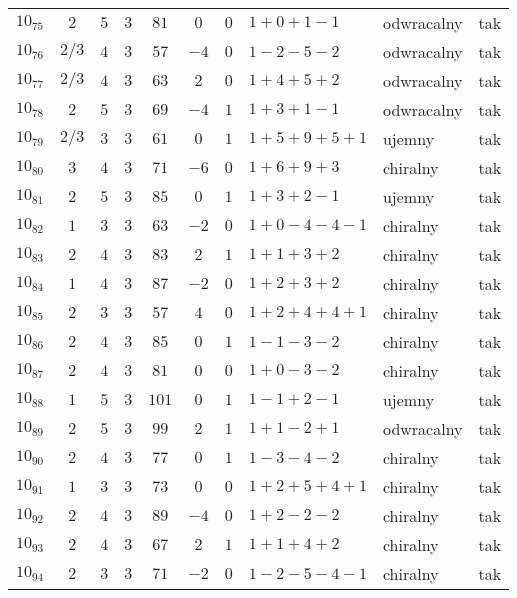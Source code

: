 \begin{longtable}{lccccccllc}
$10_{75}$  & $2$   & $5$ & $3$ & $81$  & $0$  & $0$ & $1+0+1-1$     & odwracalny & tak \\
$10_{76}$  & $2/3$ & $4$ & $3$ & $57$  & $-4$ & $0$ & $1-2-5-2$     & odwracalny & tak \\
$10_{77}$  & $2/3$ & $4$ & $3$ & $63$  & $2$  & $0$ & $1+4+5+2$     & odwracalny & tak \\
$10_{78}$  & $2$   & $5$ & $3$ & $69$  & $-4$ & $1$ & $1+3+1-1$     & odwracalny & tak \\
$10_{79}$  & $2/3$ & $3$ & $3$ & $61$  & $0$  & $1$ & $1+5+9+5+1$   & ujemny     & tak \\
$10_{80}$  & $3$   & $4$ & $3$ & $71$  & $-6$ & $0$ & $1+6+9+3$     & chiralny   & tak \\
$10_{81}$  & $2$   & $5$ & $3$ & $85$  & $0$  & $1$ & $1+3+2-1$     & ujemny     & tak \\
$10_{82}$  & $1$   & $3$ & $3$ & $63$  & $-2$ & $0$ & $1+0-4-4-1$   & chiralny   & tak \\
$10_{83}$  & $2$   & $4$ & $3$ & $83$  & $2$  & $1$ & $1+1+3+2$     & chiralny   & tak \\
$10_{84}$  & $1$   & $4$ & $3$ & $87$  & $-2$ & $0$ & $1+2+3+2$     & chiralny   & tak \\
$10_{85}$  & $2$   & $3$ & $3$ & $57$  & $4$  & $0$ & $1+2+4+4+1$   & chiralny   & tak \\
$10_{86}$  & $2$   & $4$ & $3$ & $85$  & $0$  & $1$ & $1-1-3-2$     & chiralny   & tak \\
$10_{87}$  & $2$   & $4$ & $3$ & $81$  & $0$  & $0$ & $1+0-3-2$     & chiralny   & tak \\
$10_{88}$  & $1$   & $5$ & $3$ & $101$ & $0$  & $1$ & $1-1+2-1$     & ujemny     & tak \\
$10_{89}$  & $2$   & $5$ & $3$ & $99$  & $2$  & $1$ & $1+1-2+1$     & odwracalny & tak \\
$10_{90}$  & $2$   & $4$ & $3$ & $77$  & $0$  & $1$ & $1-3-4-2$     & chiralny   & tak \\
$10_{91}$  & $1$   & $3$ & $3$ & $73$  & $0$  & $0$ & $1+2+5+4+1$   & chiralny   & tak \\
$10_{92}$  & $2$   & $4$ & $3$ & $89$  & $-4$ & $0$ & $1+2-2-2$     & chiralny   & tak \\
$10_{93}$  & $2$   & $4$ & $3$ & $67$  & $2$  & $1$ & $1+1+4+2$     & chiralny   & tak \\
$10_{94}$  & $2$   & $3$ & $3$ & $71$  & $-2$ & $0$ & $1-2-5-4-1$   & chiralny   & tak \\

\end{longtable}
